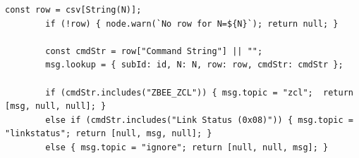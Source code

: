 \begin{description}
\begin{lstlisting}[]
        const row = csv[String(N)];
        if (!row) { node.warn(`No row for N=${N}`); return null; }
        
        const cmdStr = row["Command String"] || "";
        msg.lookup = { subId: id, N: N, row: row, cmdStr: cmdStr };
        
        if (cmdStr.includes("ZBEE_ZCL")) { msg.topic = "zcl";  return [msg, null, null]; }
        else if (cmdStr.includes("Link Status (0x08)")) { msg.topic = "linkstatus"; return [null, msg, null]; }
        else { msg.topic = "ignore"; return [null, null, msg]; }
        \end{lstlisting}
\end{description}